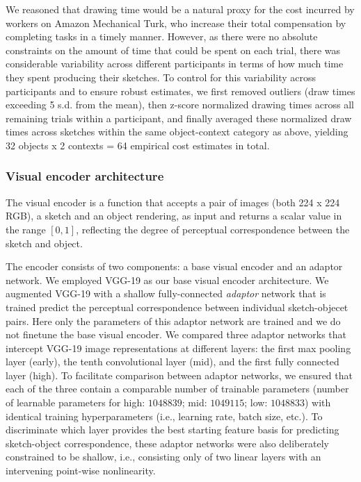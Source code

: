\documentclass[9pt,twocolumn,twoside]{pnas-new}
\begin{document}
{%
We reasoned that drawing time would be a natural proxy for the cost incurred by workers on Amazon Mechanical Turk, who increase their total compensation by completing tasks in a timely manner. 
However, as there were no absolute constraints on the amount of time that could be spent on each trial, there was considerable variability across different participants in terms of how much time they spent producing their sketches. 
To control for this variability across participants and to ensure robust estimates, we first removed outliers (draw times exceeding 5 s.d. from the mean), then z-score normalized drawing times across all remaining trials within a participant, and finally averaged these normalized draw times across sketches within the same object-context category as above, yielding 32 objects x 2 contexts = 64 empirical cost estimates in total.

\subsubsection*{Visual encoder architecture}

The visual encoder is a function that accepts a pair of images (both 224 x 224 RGB), a sketch and an object rendering, as input and returns a scalar value in the range $[0,1]$, reflecting the degree of perceptual correspondence between the sketch and object. 

The encoder consists of two components: a base visual encoder and an adaptor network. 
We employed VGG-19 \cite{simonyan2014very} as our base visual encoder architecture.
We augmented VGG-19 with a shallow fully-connected \textit{adaptor} network that is trained predict the perceptual correspondence between individual sketch-objecet pairs. 
Here only the parameters of this adaptor network are trained and we do not finetune the base visual encoder. 
We compared three adaptor networks that intercept VGG-19 image representations at different layers: the first max pooling layer (early), the tenth convolutional layer (mid), and the first fully connected layer (high). 
To facilitate comparison between adaptor networks, we ensured that each of the three contain a comparable number of trainable parameters (number of learnable parameters for high: $1048839$; mid: $1049115$; low: $1048833$) with identical training hyperparameters (i.e., learning rate, batch size, etc.). 
To discriminate which layer provides the best starting feature basis for predicting sketch-object correspondence, these adaptor networks were also deliberately constrained to be shallow, i.e., consisting only of two linear layers with an intervening point-wise nonlinearity.

}
\end{document}
